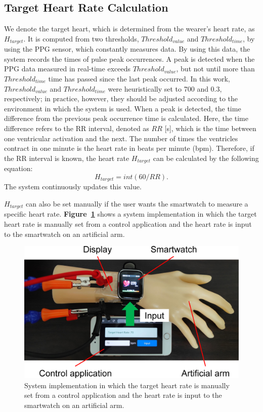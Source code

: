 \documentclass{ieeeaccess}
\newcommand\figref[1]{\textbf{Figure~\ref{fig:#1}}}
\begin{document}
\subsection{Target Heart Rate Calculation}
We denote the target heart, which is determined from the wearer's heart rate, as $H_{target}$. It is computed from two thresholds, $Threshold_{value}$ and $Threshold_{time}$, by using the PPG sensor, which constantly measures data. By using this data, the system records the times of pulse peak occurrences. A peak is detected when the PPG data measured in real-time exceeds $Threshold_{value}$, but not until more than $Threshold_{time}$ time has passed since the last peak occurred. In this work, $Threshold_{value}$ and $Threshold_{time}$ were heuristically set to 700 and 0.3, respectively; in practice, however, they should be adjusted according to the environment in which the system is used. When a peak is detected, the time difference from the previous peak occurrence time is calculated. Here, the time difference refers to the RR interval, denoted as $RR$ [s], which is the time between one ventricular activation and the next. The number of times the ventricles contract in one minute is the heart rate in beats per minute (bpm). Therefore, if the RR interval is known, the heart rate $H_{target}$ can be calculated by the following equation:
\begin{equation}
  \label{eqn:target}
  H_{target} = int(60 / RR).
\end{equation}
The system continuously updates this value.\par

$H_{target}$ can also be set manually if the user wants the smartwatch to measure a specific heart rate. \figref{system} shows a system implementation in which the target heart rate is manually set from a control application and the heart rate is input to the smartwatch on an artificial arm.

\begin{figure}[!t]
  \centering
  \includegraphics[width=1\linewidth]{figures/system.eps}
  \caption{System implementation in which the target heart rate is manually set from a control application and the heart rate is input to the smartwatch on an artificial arm.}
  \label{fig:system}
\end{figure}
\end{document}
